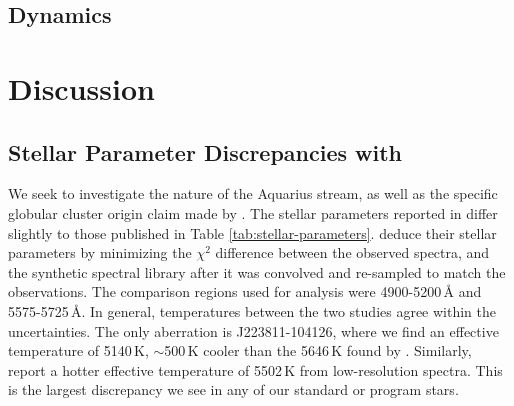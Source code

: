 \documentclass{emulateapj}
\begin{document}
\subsection{Dynamics}




\section{Discussion}
\label{sec:discussion}



\subsection{Stellar Parameter Discrepancies with \citet{wylie-de-boer;et-al_2012}}

We seek to investigate the nature of the Aquarius stream, as well as the specific globular cluster origin claim made by \citet{wylie-de-boer;et-al_2012}. The stellar parameters reported in \citet{wylie-de-boer;et-al_2012} differ slightly to those published in Table \ref{tab:stellar-parameters}. \citet{wylie-de-boer;et-al_2012} deduce their stellar parameters by minimizing the $\chi^2$ difference between the observed spectra, and the \citet{munari;et-al_2005} synthetic spectral library after it was convolved and re-sampled to match the observations. The comparison regions used for analysis were 4900-5200\,{\AA} and 5575-5725\,{\AA}. In general, temperatures between the two studies agree within the uncertainties. The only aberration is J223811-104126, where we find an effective temperature of 5140\,K, ${\sim}$500\,K cooler than the 5646\,K found by \citet{wylie-de-boer;et-al_2012}.  Similarly, \citet{williams;et-al_2011} report a hotter effective temperature of 5502\,K from low-resolution spectra. This is the largest discrepancy we see in any of our standard or program stars.
\end{document}
